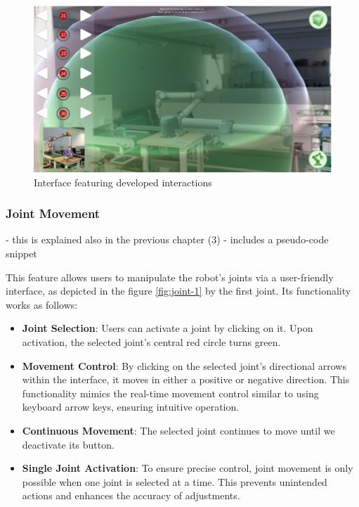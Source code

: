         \begin{figure}[h]
            \centering
            \includegraphics[width=1\linewidth]{figs/interface.png}
            \caption{Interface featuring developed interactions}
            \label{fig: interface}
        \end{figure}

        \subsubsection{Joint Movement} - this is explained also in the previous chapter (3) - includes a pseudo-code snippet

            This feature allows users to manipulate the robot's joints via a user-friendly interface, as depicted in the figure \ref{fig:joint-1} 
            by the first joint. Its functionality works as follows:


            \begin{itemize}
                \item \textbf{Joint Selection}: Users can activate a joint by clicking on it. Upon activation, the 
                selected joint's central red circle turns green.
                \item \textbf{Movement Control}: By clicking on the selected joint's directional arrows within the interface, it moves in either a 
                positive or negative direction. This functionality mimics the real-time movement control similar to using keyboard arrow keys, ensuring 
                intuitive operation.
                \item \textbf{Continuous Movement}: The selected joint continues to move until we deactivate its button.
                \item \textbf{Single Joint Activation}: To ensure precise control, joint movement is only possible when one joint is selected at a time. 
                This prevents unintended actions and enhances the accuracy of adjustments.
            \end{itemize}
        
